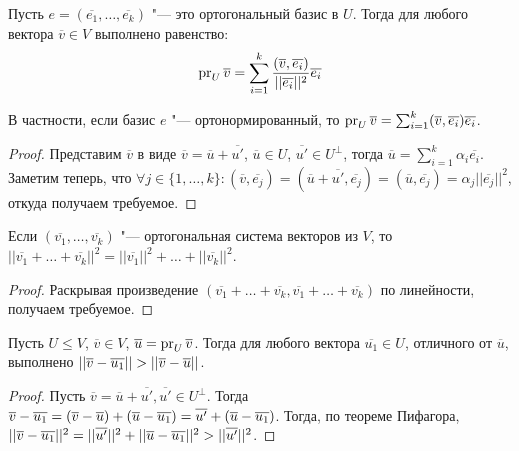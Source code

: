 \begin{proposition}
	Пусть $e = (\overline{e_1}, \dots, \overline{e_k})$ "--- это ортогональный базис в $U$. Тогда для любого вектора $\overline{v} \in V$ выполнено равенство:
	\[\operatorname{pr}_U{\overline{v}} = \sum_{i = 1}^k\frac{(\overline{v}, \overline{e_i})}{||\overline{e_i}||^2}\overline{e_i}\]
	
	В частности, если базис $e$ "--- ортонормированный, то $\operatorname{pr}_U{\overline{v}} = \sum_{i = 1}^k(\overline{v}, \overline{e_i})\overline{e_i}$.
\end{proposition}

\begin{proof}
	Представим $\overline{v}$ в виде $\overline{v} = \overline{u} + \overline{u'}$, $\overline{u} \in U$, $\overline{u'} \in U^\perp$, тогда $\overline{u} = \sum_{i = 1}^k\alpha_i\overline{e_i}$. Заметим теперь, что $\forall j \in \{1, \dots, k\}: (\overline{v}, \overline{e_j}) = (\overline{u} + \overline{u'}, \overline{e_j}) = (\overline{u}, \overline{e_j}) = \alpha_j||\overline{e_j}||^2$, откуда получаем требуемое.
\end{proof}

\begin{proposition}
	Если $(\overline{v_1}, \dots, \overline{v_k})$ "--- ортогональная система векторов из $V$, то $||\overline{v_1} + \dots + \overline{v_k}||^2 = ||\overline{v_1}||^2 + \dots + ||\overline{v_k}||^2$.
\end{proposition}

\begin{proof}
	Раскрывая произведение $(\overline{v_1} + \dots + \overline{v_k}, \overline{v_1} + \dots + \overline{v_k})$ по линейности, получаем требуемое.
\end{proof}

\begin{proposition}
	Пусть $U \le V$, $\overline{v} \in V$, $\overline{u} = \operatorname{pr}_U{\overline{v}}$. Тогда для любого вектора $\overline{u_1} \in U$, отличного от $\overline{u}$, выполнено $||\overline{v} - \overline{u_1}|| \hm{>} ||\overline{v} - \overline{u}||$.
\end{proposition}

\begin{proof}
	Пусть $\overline{v} = \overline{u} + \overline{u'}, \overline{u'} \in U^\perp$. Тогда $\overline{v} - \overline{u_1} = (\overline{v} \hm{-} \overline{u}) + (\overline{u} - \overline{u_1}) = \overline{u'} + (\overline{u} - \overline{u_1})$. Тогда, по теореме Пифагора, $||\overline{v} - \overline{u_1}||^2 \hm{=} ||\overline{u'}||^2 + ||\overline{u} - \overline{u_1}||^2 > ||\overline{u'}||^2$.
\end{proof}

